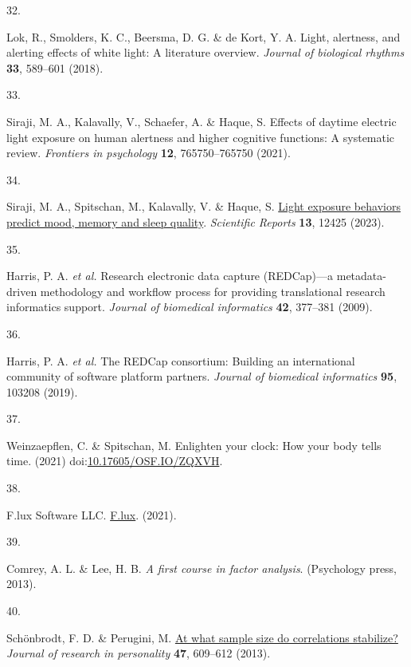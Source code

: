\documentclass[
  man]{apa6}
\newlength{\cslhangindent}
\newlength{\csllabelwidth}
\newlength{\cslentryspacingunit} %
\newenvironment{CSLReferences}[2] %
 {%
  \setlength{\parindent}{0pt}
  \ifodd #1
  \let\oldpar\par
  \def\par{\hangindent=\cslhangindent\oldpar}
  \fi
  \setlength{\parskip}{#2\cslentryspacingunit}
 }%
 {}
\newcommand{\CSLLeftMargin}[1]{\parbox[t]{\csllabelwidth}{#1}}
\newcommand{\CSLRightInline}[1]{\parbox[t]{\linewidth - \csllabelwidth}{#1}\break}
\begin{document}
\begin{CSLReferences}{0}{0}
\leavevmode{}%
\CSLLeftMargin{32. }%
\CSLRightInline{Lok, R., Smolders, K. C., Beersma, D. G. \& de Kort, Y. A. Light, alertness, and alerting effects of white light: A literature overview. \emph{Journal of biological rhythms} \textbf{33}, 589--601 (2018).}

\leavevmode{}%
\CSLLeftMargin{33. }%
\CSLRightInline{Siraji, M. A., Kalavally, V., Schaefer, A. \& Haque, S. Effects of daytime electric light exposure on human alertness and higher cognitive functions: A systematic review. \emph{Frontiers in psychology} \textbf{12}, 765750--765750 (2021).}

\leavevmode{}%
\CSLLeftMargin{34. }%
\CSLRightInline{Siraji, M. A., Spitschan, M., Kalavally, V. \& Haque, S. \href{https://doi.org/10.1038/s41598-023-39636-y}{Light exposure behaviors predict mood, memory and sleep quality}. \emph{Scientific Reports} \textbf{13}, 12425 (2023).}

\leavevmode{}%
\CSLLeftMargin{35. }%
\CSLRightInline{Harris, P. A. \emph{et al.} Research electronic data capture (REDCap)---a metadata-driven methodology and workflow process for providing translational research informatics support. \emph{Journal of biomedical informatics} \textbf{42}, 377--381 (2009).}

\leavevmode{}%
\CSLLeftMargin{36. }%
\CSLRightInline{Harris, P. A. \emph{et al.} The REDCap consortium: Building an international community of software platform partners. \emph{Journal of biomedical informatics} \textbf{95}, 103208 (2019).}

\leavevmode{}%
\CSLLeftMargin{37. }%
\CSLRightInline{Weinzaepflen, C. \& Spitschan, M. Enlighten your clock: How your body tells time. (2021) doi:\href{https://doi.org/10.17605/OSF.IO/ZQXVH}{10.17605/OSF.IO/ZQXVH}.}

\leavevmode{}%
\CSLLeftMargin{38. }%
\CSLRightInline{F.lux Software LLC. \href{https://justgetflux.com/}{F.lux}. (2021).}

\leavevmode{}%
\CSLLeftMargin{39. }%
\CSLRightInline{Comrey, A. L. \& Lee, H. B. \emph{A first course in factor analysis}. (Psychology press, 2013).}

\leavevmode{}%
\CSLLeftMargin{40. }%
\CSLRightInline{Schönbrodt, F. D. \& Perugini, M. \href{https://doi.org/10.1016/j.jrp.2013.05.009}{At what sample size do correlations stabilize?} \emph{Journal of research in personality} \textbf{47}, 609--612 (2013).}


\end{CSLReferences}
\end{document}
